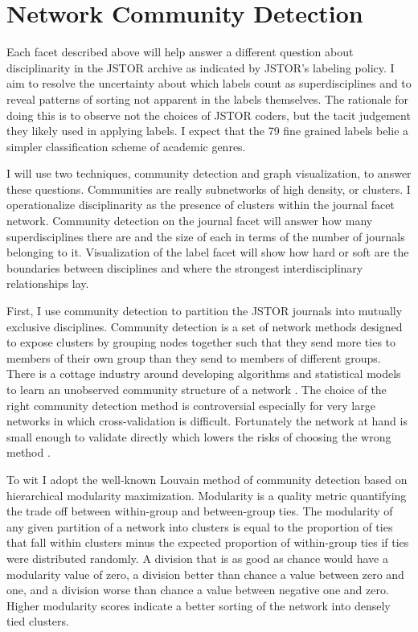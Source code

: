 \documentclass[]{book}
\theoremstyle{definition}
\theoremstyle{definition}
\theoremstyle{definition}
\theoremstyle{remark}
\begin{document}
\hypertarget{network-community-detection}{%
\section{Network Community
Detection}\label{network-community-detection}}

Each facet described above will help answer a different question about
disciplinarity in the JSTOR archive as indicated by JSTOR's labeling
policy. I aim to resolve the uncertainty about which labels count as
superdisciplines and to reveal patterns of sorting not apparent in the
labels themselves. The rationale for doing this is to observe not the
choices of JSTOR coders, but the tacit judgement they likely used in
applying labels. I expect that the 79 fine grained labels belie a
simpler classification scheme of academic genres.

I will use two techniques, community detection and graph visualization,
to answer these questions. Communities are really subnetworks of high
density, or clusters. I operationalize disciplinarity as the presence of
clusters within the journal facet network. Community detection on the
journal facet will answer how many superdisciplines there are and the
size of each in terms of the number of journals belonging to it.
Visualization of the label facet will show how hard or soft are the
boundaries between disciplines and where the strongest interdisciplinary
relationships lay.

First, I use community detection to partition the JSTOR journals into
mutually exclusive disciplines. Community detection is a set of network
methods designed to expose clusters by grouping nodes together such that
they send more ties to members of their own group than they send to
members of different groups. There is a cottage industry around
developing algorithms and statistical models to learn an unobserved
community structure of a network \citep[see][ for an excellent
review]{Fortunato2016Community}. The choice of the right community
detection method is controversial especially for very large networks in
which cross-validation is difficult. Fortunately the network at hand is
small enough to validate directly which lowers the risks of choosing the
wrong method .

To wit I adopt the well-known Louvain method of community detection
based on hierarchical modularity maximization. \citep{Blondel2008Fast}
Modularity is a quality metric quantifying the trade off between
within-group and between-group ties. The modularity of any given
partition of a network into clusters is equal to the proportion of ties
that fall within clusters minus the expected proportion of within-group
ties if ties were distributed randomly. A division that is as good as
chance would have a modularity value of zero, a division better than
chance a value between zero and one, and a division worse than chance a
value between negative one and zero. \citep[8]{Newman2004Finding} Higher
modularity scores indicate a better sorting of the network into densely
tied clusters.
\end{document}
